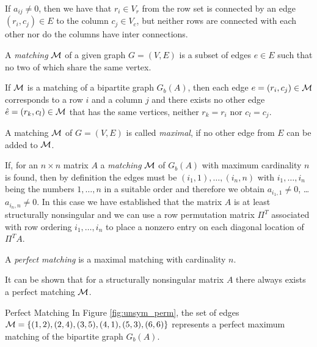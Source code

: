 If $a_{ij}\not=0$, 
then we have that $r_i \in V_r$ from the row set
is connected by an edge $(r_i,c_j) \in E$ to the column $c_j \in V_c$,
but neither rows are connected with each other nor do the columns have
inter connections.
\begin{definition}\label{def:matching}
A \emph{matching} $\mathcal{M}$ 
of a given graph $G= (V,E)$ is a subset of edges
$e\in E$ such that no two of which share the same vertex. 
\end{definition}
If $\mathcal{M}$ is a
matching of a bipartite graph $G_b(A)$, then each edge $e=(r_i,c_j) \in \mathcal{M}$ 
corresponds to a row $i$ and a column $j$ and there exists no other edge 
$\hat e=(r_k,c_l) \in \mathcal{M}$ 
that has the same vertices, neither $r_k=r_i$ nor $c_l=c_j$. 
\begin{definition}\label{def:maxmatching}
A matching $\mathcal{M}$ of $G=(V,E)$ is called
\emph{maximal}, if no other edge from $E$ can be added to $\mathcal{M}$.
\end{definition}
If, for an $n \times n$ matrix $A$ a \emph{matching} $\mathcal{M}$ of $G_b(A)$ with
maximum cardinality $n$ is found, then by definition the edges 
must be $(i_1,1),\dots,(i_n,n)$ with $i_1,\dots,i_n$ being the 
numbers $1,\dots,n$ in a suitable order and therefore we obtain
$a_{i_1,1}\not=0$, \dots
$a_{i_n,n}\not=0$. In this case 
we have established that the
matrix $A$ is at least structurally nonsingular and we can use a 
row permutation matrix $\Pi^T$ associated with row ordering $i_1,\dots,i_n$ 
to place a nonzero entry on each diagonal location of $\Pi^TA$.
\begin{definition}\label{def:perfect-matching}
A \emph{perfect matching} is a maximal matching with cardinality $n$.
\end{definition}
It can be shown that for a structurally nonsingular matrix $A$ there always
exists a perfect matching $\mathcal{M}$.
\begin{example}{Perfect Matching}\label{exm:perfect_matching}
In Figure \ref{fig:unsym_perm}, the set of edges $\mathcal{M}= \{(1,2), (2,4),
(3,5), (4,1), (5,3), (6,6) \}$ represents a perfect maximum matching
of the bipartite graph $G_b(A)$.
\end{example}

